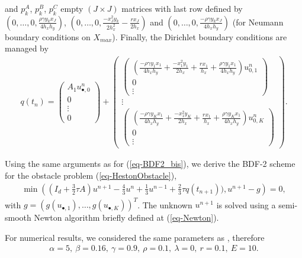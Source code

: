 \documentclass[12pt,a4paper]{article}
\begin{document}
and $p^A_k$, $p^B_k$, $p^C_k$ empty $(J \times J)$ matrices with last row defined by $(0,\dots,0,\frac{\rho \gamma y_k x_J}{4 h_x h_y})$, $(0,\dots,0,\frac{-x_J^2 y_k}{2 h_x^2} - \frac{r x_J}{2 h_x})$ and $(0,\dots,0,\frac{-\rho \gamma y_k x_J}{4 h_x h_y})$ (for Neumann boundary conditions on $X_{max}$). Finally, the Dirichlet boundary conditions are managed by
\begin{align*}
q(t_n) = 
\begin{pmatrix}
	A_1 u_{\bullet, 0}^n \\
	0 \\
	\vdots \\
	0
\end{pmatrix} +
\begin{pmatrix}
\begin{pmatrix}
		\left( \frac{-\rho \gamma y_1 x_1}{4 h_x h_y} + \frac{-x_1^2 y_1}{2h_x} + \frac{r x_1}{h_x} + \frac{\rho \gamma y_1 x_1}{4 h_x h_y} \right) u_{0,1}^n \\
		0 \\
		\vdots
\end{pmatrix} \\
\vdots \\ 
\begin{pmatrix}
		\left( \frac{-\rho \gamma y_K x_1}{4 h_x h_y} + \frac{-x_1^2 y_K}{2h_x} + \frac{r x_1}{h_x} + \frac{\rho \gamma y_K x_1}{4 h_x h_y} \right) u_{0,K}^n \\
		0 \\
		\vdots
\end{pmatrix}
\end{pmatrix}.
\end{align*}

Using the same arguments as for (\ref{eq-BDF2_bis}), we derive the BDF-2 scheme for the obstacle problem (\ref{eq-HestonObstacle}),
\begin{align*}
	\min\left( (I_d +\frac{3}{2} \tau A) u^{n+1} - \frac{4}{3} u^n + \frac{1}{3} u^{n-1} + \frac{2}{3} \tau q(t_{n+1})), u^{n+1} - g \right) = 0,
\end{align*}
with $g = (g(u_{\bullet,1}),\dots,g(u_{\bullet,K}))^T$. The unknown $u^{n+1}$ is solved using a semi-smooth Newton algorithm briefly defined at (\ref{eq-Newton}).

For numerical results, we considered the same parameters as \cite{Oosterlee}, therefore
\begin{align}
	\alpha = 5, \: \beta = 0.16, \: \gamma = 0.9, \: \rho = 0.1, \: \lambda = 0, \: r = 0.1, \: E = 10. \label{eq-Heston_parameters}
\end{align}
\end{document}
